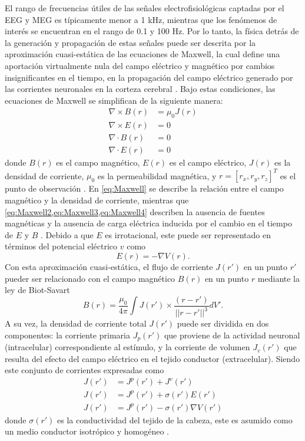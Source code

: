 El rango de frecuencias útiles de las señales electrofisiológicas captadas por el EEG y MEG es típicamente menor a 1 kHz, mientras que los fenómenos de interés se encuentran en el rango de 0.1 y 100 Hz.
Por lo tanto, la física detrás de la generación y propagación de estas señales puede ser descrita por la aproximación cuasi-estática de las ecuaciones de Maxwell, la cual define una aportación virtualmente nula del campo eléctrico y magnético por cambios insignificantes en el tiempo, en la propagación del campo eléctrico generado por las corrientes neuronales en la corteza cerebral \cite{Hamalainen1993, Plonsey1967}.
Bajo estas condiciones, las ecuaciones de Maxwell se simplifican de la siguiente manera:
\begin{align}
	\nabla \times B(r) & = \mu_{0} J (r) \label{eq:Maxwell} \\
	\nabla \times E(r) & = 0 \label{eq:Maxwell2}            \\
	\nabla \cdot B(r)  & = 0 \label{eq:Maxwell3}            \\
	\nabla \cdot E(r)  & = 0 \label{eq:Maxwell4}
\end{align}
donde $B(r)$ es el campo magnético, $E(r)$ es el campo eléctrico, $J(r)$ es la densidad de corriente, $\mu_{0}$ es la permeabilidad magnética, y $r = [r_x, r_y, r_z]^T$ es el punto de observación \cite{Gutierrez2008}.
En \cref{eq:Maxwell} se describe la relación entre el campo magnético y la densidad de corriente, mientras que \cref{eq:Maxwell2,eq:Maxwell3,eq:Maxwell4} describen la ausencia de fuentes magnéticas y la ausencia de carga eléctrica inducida por el cambio en el tiempo de $E$ y $B$ \cite{Hamalainen1993}.
Debido a que $E$ es irrotacional, este puede ser representado en términos del potencial eléctrico $v$ como
\begin{equation}
	E(r) = -\nabla V(r)\text{.} \label{eq:potencial}
\end{equation}
Con esta aproximación cuasi-estática, el flujo de corriente $J(r')$ en un punto $r'$ pueder ser relacionado con el campo magnético $B(r)$ en un punto $r$ mediante la ley de Biot-Savart
\begin{equation}
	B(r) = \frac{\mu_{0}}{4\pi} \int J(r') \times \frac{(r - r')}{||r - r'||^3} dV'\text{.} \label{eq:biot-savart}
\end{equation}
A su vez, la densidad de corriente total $J(r')$ puede ser dividida en dos componentes: la corriente primaria $J_{p}(r')$ que proviene de la actividad neuronal (intracelular) correspondiente al estímulo, y la corriente de volumen $J_{v}(r')$ que resulta del efecto del campo eléctrico en el tejido conductor (extracelular).
Siendo este conjunto de corrientes expresadas como
\begin{align}
	J(r') & = J^{p}(r') + J^{v}(r') \label{eq:corriente1}               \\
	J(r') & = J^{p}(r') + \sigma(r') E(r') \label{eq:corriente2}        \\
	J(r') & = J^{p}(r') - \sigma(r') \nabla V(r') \label{eq:corriente3}
\end{align}
donde $\sigma(r')$ es la conductividad del tejido de la cabeza, este es asumido como un medio conductor isotrópico y homogéneo \cite{Baillet2001, Gutierrez2008}.

